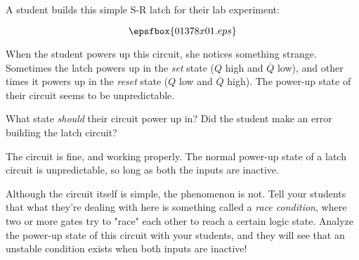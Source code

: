 

A student builds this simple S-R latch for their lab experiment:

$$\epsfbox{01378x01.eps}$$

When the student powers up this circuit, she notices something strange.  Sometimes the latch powers up in the {\it set} state ($Q$ high and $\overline{Q}$ low), and other times it powers up in the {\it reset} state ($Q$ low and $\overline{Q}$ high).  The power-up state of their circuit seems to be unpredictable.

What state {\it should} their circuit power up in?  Did the student make an error building the latch circuit?







The circuit is fine, and working properly.  The normal power-up state of a latch circuit is unpredictable, so long as both the inputs are inactive.







Although the circuit itself is simple, the phenomenon is not.  Tell your students that what they're dealing with here is something called a {\it race condition}, where two or more gates try to "race" each other to reach a certain logic state.  Analyze the power-up state of this circuit with your students, and they will see that an unstable condition exists when both inputs are inactive!




